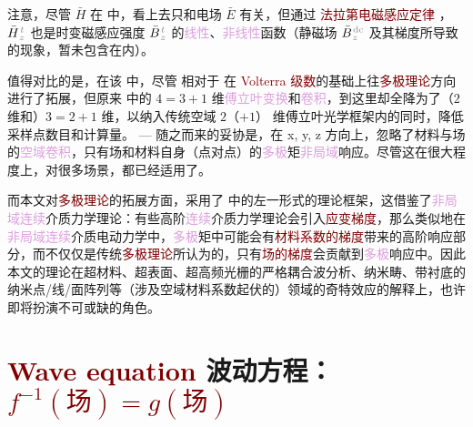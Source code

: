 注意，尽管 $\bar{H}$ 在  中，看上去只和电场 $\bar{E}$ 有关，但通过 \textcolor{Maroon}{法拉第电磁感应定律} ，$\bar{H}^{\;\!\mathcolor{gray}{t}}_{\;\! \mathcolor{gray}{z}}$ 也是时变磁感应强度 $\bar{B}^{\;\!\mathcolor{gray}{t}}_{\;\! \mathcolor{gray}{z}}$ 的\textcolor{Plum}{线性}、\textcolor{Plum}{非线性}函数（静磁场 $\bar{B}^{\;\!\mathcolor{gray}{\text{dc}}}_{\;\! \mathcolor{gray}{z}}$ 及其梯度所导致的现象，暂未包含在内）。

值得对比的是，在该  中，尽管  相对于  在 \textcolor{Maroon}{Volterra 级数}的基础上往\textcolor{Maroon}{多极理论}方向进行了拓展，但原来  中的 $4=3+1$ 维\textcolor{Plum}{傅立叶变换}和\textcolor{Plum}{卷积}，到这里却全降为了（$2$ 维和）$3=2+1$ 维，以纳入传统空域 $2$（$+1$） 维\textcolor{NavyBlue}{傅立叶光学}框架内的同时，降低采样点数目和计算量。 ---  随之而来的妥协是，在 x, y, z 方向上，忽略了材料与场的\textcolor{Plum}{空域卷积}，只有场和材料自身（点对点）的\textcolor{Plum}{多极}矩\textcolor{Plum}{非局域}响应。尽管这在很大程度上，对很多场景，都已经适用了。

而本文对\textcolor{Maroon}{多极理论}的拓展方面，采用了  中的左一形式的\textcolor{NavyBlue}{理论框架}，这借鉴了\textcolor{Plum}{非局域}\textcolor{Plum}{连续}介质\textcolor{NavyBlue}{力学}理论：有些高阶\textcolor{Plum}{连续}介质\textcolor{NavyBlue}{力学}理论会引入\textcolor{Maroon}{应变梯度}\cite{LiuYingHuaGaoJieLianXuJieZhiLiLun2024}，那么类似地在\textcolor{Plum}{非局域}\textcolor{Plum}{连续}介质\textcolor{NavyBlue}{电动力学}中，\textcolor{Plum}{多极}矩中可能会有\textcolor{Maroon}{材料系数的梯度}带来的高阶响应部分，而不仅仅是传统\textcolor{Maroon}{多极理论}所认为的，只有\textcolor{Maroon}{场的梯度}会贡献到\textcolor{Plum}{多极}响应中。因此本文的理论在超材料、超表面、超高频光栅的严格耦合波分析、纳米畴、带衬底的纳米点/线/面阵列等（涉及空域材料系数起伏的）领域的奇特效应的解释上，也许即将扮演不可或缺的角色。

\vspace*{-2.5em}

\section{\textcolor{Maroon}{Wave equation} 波动方程：\textcolor{Maroon}{$f^{-1}(\text{场}) = g(\text{场})$}}\label{sec:waveq}

\vspace*{-0.5em}

